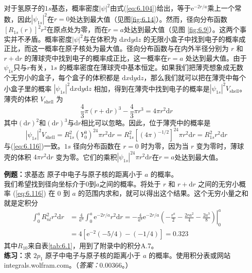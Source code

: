     对于氢原子的$1s$基态，概率密度$\left|\psi\right|^2$由式(\ref{eq:6.104})给出，等于$\mathrm{e}^{-2r/a}$乘上一个常数，因此$\left|\psi_{1s}\right|^2$在$r=0$处达到最大值（见图\ref{fig:6.14}）。然而，径向分布函数$\left[R_{1s}\left(r\right)\right]^2r^2$在原点处为零，而在$r=a$处达到最大值（见图 \ref{fig:6.9}）。这两个事实并不矛盾。概率密度$\left|\psi\right|^2$与在体积为 $\mathrm{d}x\mathrm{d}y\mathrm{d}z$ 的无限小盒子中找到电子的概率成正比，而这一概率在原子核处为最大值。径向分布函数与在内外半径分别为 $r$ 和 $r +\mathrm{d}r$ 的薄球壳中找到电子的概率成正比，这一概率在$r = a$ 处达到最大值。由于$\psi_{1s}$只与$r$有关，$1s$ 的概率密度在薄球壳中基本恒定。如果我们把薄壳想象成无数个无穷小的盒子，每个盒子的体积都是 $\mathrm{d}x\mathrm{d}y\mathrm{d}z$，那么我们就可以把在薄壳中每个小盒子里的概率 $\left|\psi_{1s}\right|^2\mathrm{d}x\mathrm{d}y\mathrm{d}z$ 相加，得到在薄壳中找到电子的概率是$\left|\psi_{1s}\right|^2V_{\text{shell}}$。薄壳的体积 $V_{\text{shell}}$ 为
    \begin{equation*}
        \frac{4}{3}\pi\left(r+\mathrm{d}r\right)^3 - \frac{4}{3}\pi r^3 = 4\pi r^2\mathrm{d}r
    \end{equation*}
    其中$\left(\mathrm{d}r\right)^2$和$\left(\mathrm{d}r\right)^3$与$\mathrm{d}r$相比可以忽略。因此，位于薄壳中的概率是
    \begin{equation*}
        \left|\psi_{1s}\right|^2V_{\text{shell}} = R_{1s}^2\left(Y_0^0\right)^24\pi r^2\mathrm{d}r = R_{1s}^2\left[\left(4\pi\right)^{-1/2}\right]^24\pi r^2\mathrm{d}r = R_{1s}^2r^2\mathrm{d}r
    \end{equation*}
    与(\ref{eq:6.116})一致。$1s$ 径向分布函数在 $r =0$ 时为零，因为当 $r$ 变为零时，薄球壳的体积 $4\pi r^2\mathrm{d}r$ 变为零。它们的乘积$\left|\psi_{1s}\right|^24\pi r^2\mathrm{d}r$在$r=a$处达到最大值。

    \begin{examplebox}
        \textbf{例题：}求基态  原子中电子与原子核的距离小于 $a$ 的概率。
        \\

        我们希望找到径向坐标介于$0$到$a$之间的概率。将处于 $r$ 和 $r +\mathrm{d}r$ 之间的无穷小概率 (\ref{eq:6.116}) 在 $0$ 到 $a$ 的范围内求和，就可以得出这个结果。这个无穷小量之和就是定积分
        \begin{equation*}
            \begin{aligned}
                \int_{0}^{a}R_{nl}^2r^2\mathrm{d}r & = \frac{4}{a^3}\int_{0}^{a}\mathrm{e}^{-2r/a}r^2\mathrm{d}r  = \left. -\frac{4}{a^3}\mathrm{e}^{-2r/a}\left(-\frac{r^a}{2} - \frac{2ra^2}{4} - \frac{2a^3}{8}\right)\right|_{0}^{a}\\
                & = 4\left[\mathrm{e}^{-2}\left(-5/4\right)- \left(-1/4\right)\right] = 0.323          
            \end{aligned}
        \end{equation*}
        其中$R_{10}$来自表\ref{tab:6.1}，用到了附录中的积分A.7。
        \\

        \textbf{练习：}求 $2p_1$  原子中电子与原子核的距离小于 $a$ 的概率。使用积分表或网站integrals.wolfram.com。（\textit{答案：}$0.00366$。）
    \end{examplebox}

